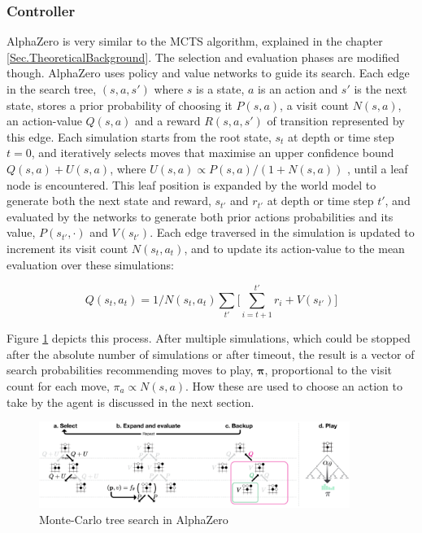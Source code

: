 \subsubsection{Controller}

AlphaZero \cite{Algo.AlphaZero} is very similar to the MCTS algorithm, explained in the chapter \ref{Sec.TheoreticalBackground}. The selection and evaluation phases are modified though. AlphaZero uses policy and value networks to guide its search. Each edge in the search tree, $(s, a, s')$ where $s$ is a state, $a$ is an action and $s'$ is the next state, stores a prior probability of choosing it $P(s, a)$, a visit count $N(s, a)$, an action-value $Q(s, a)$ and a reward $R(s, a, s')$ of transition represented by this edge. Each simulation starts from the root state, $s_t$ at depth or time step $t=0$, and iteratively selects moves that maximise an upper confidence bound $Q(s, a) + U(s, a)$, where $U(s, a) \propto P(s, a)/(1+ N(s, a))$ \cite{Algo.AlphaGoZero}, until a leaf node is encountered. This leaf position is expanded by the world model to generate both the next state and reward, $s_{t'}$ and $r_{t'}$ at depth or time step $t'$, and evaluated by the networks to generate both prior actions probabilities and its value, $P(s_{t'}, \cdot)$ and $V(s_{t'})$. Each edge traversed in the simulation is updated to increment its visit count $N(s_t, a_t)$, and to update its action-value to the mean evaluation over these simulations:

$$Q(s_t, a_t) = 1/N(s_t, a_t) \sum_{t'}\Big[ \sum^{t'}_{i = t + 1}r_i + V(s_{t'}) \Big]$$

Figure \ref{Fig.MCTSinAlphaZero} depicts this process. After multiple simulations, which could be stopped after the absolute number of simulations or after timeout, the result is a vector of search probabilities recommending moves to play, $\boldsymbol\pi$, proportional to the visit count for each move, $\pi_a \propto N(s, a)$. How these are used to choose an action to take by the agent is discussed in the next section.

\begin{figure}[H]
\includegraphics[width=0.9\textwidth,keepaspectratio]{figures/AlphaZero/MCTS.png}
\caption{Monte-Carlo tree search in AlphaZero \cite{Algo.AlphaGoZero}}
\label{Fig.MCTSinAlphaZero}
\end{figure}

